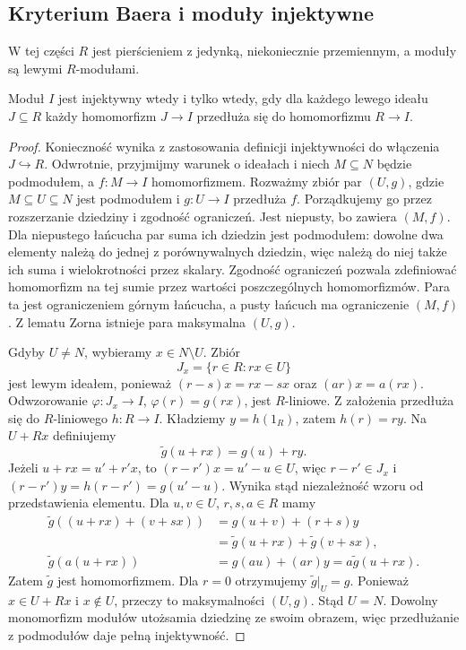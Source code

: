 \subsection{Kryterium Baera i moduły injektywne}
W tej części $R$ jest pierścieniem z jedynką, niekoniecznie przemiennym, a moduły są lewymi $R$-modułami.
\begin{twierdzenie}\label{cat:thm:baer}
Moduł $I$ jest injektywny wtedy i tylko wtedy, gdy dla każdego lewego ideału $J\subseteq R$ każdy homomorfizm $J\to I$ przedłuża się do homomorfizmu $R\to I$.
\end{twierdzenie}
\begin{proof}
Konieczność wynika z zastosowania definicji injektywności do włączenia $J\hookrightarrow R$. Odwrotnie, przyjmijmy warunek o ideałach i niech $M\subseteq N$ będzie podmodułem, a $f:M\to I$ homomorfizmem. Rozważmy zbiór par $(U,g)$, gdzie $M\subseteq U\subseteq N$ jest podmodułem i $g:U\to I$ przedłuża $f$. Porządkujemy go przez rozszerzanie dziedziny i zgodność ograniczeń. Jest niepusty, bo zawiera $(M,f)$. Dla niepustego łańcucha par suma ich dziedzin jest podmodułem: dowolne dwa elementy należą do jednej z porównywalnych dziedzin, więc należą do niej także ich suma i wielokrotności przez skalary. Zgodność ograniczeń pozwala zdefiniować homomorfizm na tej sumie przez wartości poszczególnych homomorfizmów. Para ta jest ograniczeniem górnym łańcucha, a pusty łańcuch ma ograniczenie $(M,f)$. Z lematu Zorna istnieje para maksymalna $(U,g)$.

Gdyby $U\ne N$, wybieramy $x\in N\setminus U$. Zbiór
\[
 J_x=\{r\in R:rx\in U\}
\]
jest lewym ideałem, ponieważ $(r-s)x=rx-sx$ oraz $(ar)x=a(rx)$. Odwzorowanie $\varphi:J_x\to I$, $\varphi(r)=g(rx)$, jest $R$-liniowe. Z założenia przedłuża się do $R$-liniowego $h:R\to I$. Kładziemy $y=h(1_R)$, zatem $h(r)=ry$. Na $U+Rx$ definiujemy
\[
 \widetilde g(u+rx)=g(u)+ry.
\]
Jeżeli $u+rx=u'+r'x$, to $(r-r')x=u'-u\in U$, więc $r-r'\in J_x$ i
$(r-r')y=h(r-r')=g(u'-u)$. Wynika stąd niezależność wzoru od przedstawienia elementu. Dla $u,v\in U$, $r,s,a\in R$ mamy
\[
\begin{aligned}
\widetilde g((u+rx)+(v+sx))&=g(u+v)+(r+s)y\\
&=\widetilde g(u+rx)+\widetilde g(v+sx),\\
\widetilde g(a(u+rx))&=g(au)+(ar)y=a\widetilde g(u+rx).
\end{aligned}
\]
Zatem $\widetilde g$ jest homomorfizmem. Dla $r=0$ otrzymujemy $\widetilde g|_U=g$. Ponieważ $x\in U+Rx$ i $x\notin U$, przeczy to maksymalności $(U,g)$. Stąd $U=N$. Dowolny monomorfizm modułów utożsamia dziedzinę ze swoim obrazem, więc przedłużanie z podmodułów daje pełną injektywność.
\end{proof}
